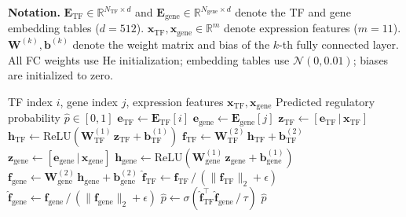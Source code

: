 \documentclass[journal]{IEEEtran}
\begin{document}
\textbf{Notation.}
$\mathbf{E}_{\text{TF}} \in \mathbb{R}^{N_{\text{TF}} \times d}$ and
$\mathbf{E}_{\text{gene}} \in \mathbb{R}^{N_{\text{gene}} \times d}$ denote
the TF and gene embedding tables ($d = 512$).
$\mathbf{x}_{\text{TF}}, \mathbf{x}_{\text{gene}} \in \mathbb{R}^m$ denote
expression features ($m = 11$).
$\mathbf{W}^{(k)}, \mathbf{b}^{(k)}$ denote the weight matrix and bias of
the $k$-th fully connected layer. All FC weights use He initialization;
embedding tables use $\mathcal{N}(0, 0.01)$; biases are initialized to zero.

\begin{algorithm}[!t]
\caption{Two-Tower Forward Pass}
\label{alg:two_tower}
\begin{algorithmic}[1]
\REQUIRE TF index $i$, gene index $j$, expression features $\mathbf{x}_{\text{TF}}, \mathbf{x}_{\text{gene}}$
\ENSURE Predicted regulatory probability $\hat{p} \in [0, 1]$
\STATE $\mathbf{e}_{\text{TF}} \leftarrow \mathbf{E}_{\text{TF}}[i]$ 
\STATE $\mathbf{e}_{\text{gene}} \leftarrow \mathbf{E}_{\text{gene}}[j]$ 
\STATE {}
\STATE $\mathbf{z}_{\text{TF}} \leftarrow [\mathbf{e}_{\text{TF}} \,|\, \mathbf{x}_{\text{TF}}]$ 
\STATE $\mathbf{h}_{\text{TF}} \leftarrow \text{ReLU}(\mathbf{W}^{(1)}_{\text{TF}} \, \mathbf{z}_{\text{TF}} + \mathbf{b}^{(1)}_{\text{TF}})$ 
\STATE $\mathbf{f}_{\text{TF}} \leftarrow \mathbf{W}^{(2)}_{\text{TF}} \, \mathbf{h}_{\text{TF}} + \mathbf{b}^{(2)}_{\text{TF}}$ 
\STATE {}
\STATE $\mathbf{z}_{\text{gene}} \leftarrow [\mathbf{e}_{\text{gene}} \,|\, \mathbf{x}_{\text{gene}}]$
\STATE $\mathbf{h}_{\text{gene}} \leftarrow \text{ReLU}(\mathbf{W}^{(1)}_{\text{gene}} \, \mathbf{z}_{\text{gene}} + \mathbf{b}^{(1)}_{\text{gene}})$
\STATE $\mathbf{f}_{\text{gene}} \leftarrow \mathbf{W}^{(2)}_{\text{gene}} \, \mathbf{h}_{\text{gene}} + \mathbf{b}^{(2)}_{\text{gene}}$
\STATE {}
\STATE $\hat{\mathbf{f}}_{\text{TF}} \leftarrow \mathbf{f}_{\text{TF}} \,/\, (\|\mathbf{f}_{\text{TF}}\|_2 + \epsilon)$ 
\STATE $\hat{\mathbf{f}}_{\text{gene}} \leftarrow \mathbf{f}_{\text{gene}} \,/\, (\|\mathbf{f}_{\text{gene}}\|_2 + \epsilon)$
\STATE $\hat{p} \leftarrow \sigma\!\left(\hat{\mathbf{f}}_{\text{TF}}^{\top} \hat{\mathbf{f}}_{\text{gene}} \,/\, \tau\right)$ 
\RETURN $\hat{p}$
\end{algorithmic}
\end{algorithm}
\end{document}
